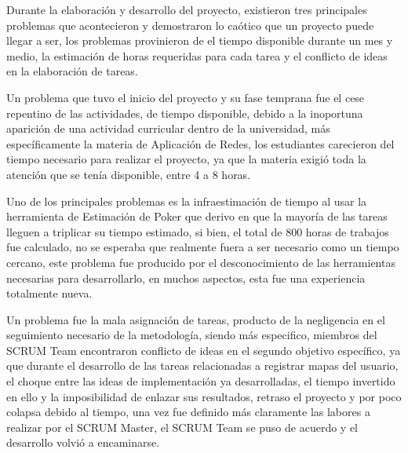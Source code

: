 Durante la elaboración y desarrollo del proyecto, existieron tres principales problemas que acontecieron y demostraron lo caótico que un proyecto puede llegar a ser, los problemas provinieron de el tiempo disponible durante un mes y medio, la estimación de horas requeridas para cada tarea y el conflicto de ideas en la elaboración de tareas.

Un problema que tuvo el inicio del proyecto y su fase temprana fue el cese repentino de las actividades, de tiempo disponible, debido a la inoportuna aparición de una actividad curricular dentro de la universidad, más específicamente la materia de Aplicación de Redes, los estudiantes carecieron del tiempo necesario para realizar el proyecto, ya que la materia exigió toda la atención que se tenía disponible, entre 4 a 8 horas.

Uno de los principales problemas es la infraestimación de tiempo al usar la herramienta de Estimación de Poker que derivo en que la mayoría de las tareas lleguen a triplicar su tiempo estimado, si bien, el  total de 800  horas de trabajos fue calculado, no se esperaba que realmente fuera a ser necesario como un tiempo cercano, este problema fue producido por el desconocimiento de las herramientas necesarias para desarrollarlo, en muchos aspectos, esta fue una experiencia totalmente nueva.

Un problema fue la mala asignación de tareas, producto de la negligencia en el seguimiento necesario de la metodología, siendo más especifico, miembros del SCRUM Team encontraron conflicto de ideas en el segundo objetivo específico, ya que durante el desarrollo de las tareas relacionadas a registrar mapas del usuario, el choque entre las ideas de implementación ya desarrolladas, el tiempo invertido en ello y la imposibilidad de enlazar sus resultados, retraso el proyecto y por poco colapsa debido al tiempo, una vez fue definido más claramente las labores a realizar por el SCRUM Master, el SCRUM Team se puso de acuerdo y el desarrollo volvió a encaminarse.

